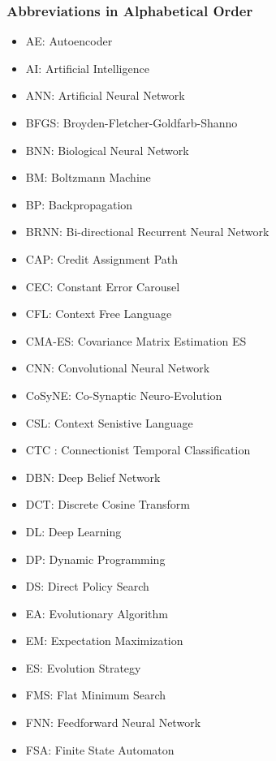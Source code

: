 \documentclass[letterpaper]{article}
\begin{document}
\begin{CJK*}{UTF8}{gbsn}
\subsubsection*{Abbreviations in Alphabetical Order}
\label{abb}
\vspace{-0.5cm}
\begin{multicols}{2}
\begin{itemize}[leftmargin=0cm,itemindent=0cm,labelwidth=\itemindent,labelsep=0cm,align=left,noitemsep,nolistsep]
\item[] AE: Autoencoder    
\item[] AI: Artificial Intelligence 
\item[] ANN: Artificial Neural Network    
\item[] BFGS: Broyden-Fletcher-Goldfarb-Shanno    
\item[] BNN: Biological Neural Network 
\item[] BM: Boltzmann Machine 
\item[] BP: Backpropagation 
\item[] BRNN: Bi-directional Recurrent Neural Network 
\item[] CAP: Credit Assignment Path 
\item[] CEC: Constant Error Carousel 
\item[] CFL: Context Free Language 
\item[] CMA-ES: Covariance Matrix Estimation ES 
\item[] CNN: Convolutional Neural Network 
\item[] CoSyNE: Co-Synaptic Neuro-Evolution 
\item[] CSL: Context Senistive Language
\item[] CTC : Connectionist Temporal Classification 
\item[] DBN: Deep Belief Network 
\item[] DCT: Discrete Cosine Transform
\item[] DL: Deep Learning 
\item[] DP: Dynamic Programming  
\item[] DS: Direct Policy Search
\item[] EA: Evolutionary Algorithm 
\item[] EM: Expectation Maximization 
\item[] ES: Evolution Strategy 
\item[] FMS: Flat Minimum Search
\item[] FNN: Feedforward Neural Network  
\item[] FSA: Finite State Automaton 

\end{itemize}
\end{multicols}
\end{CJK*}
\end{document}
